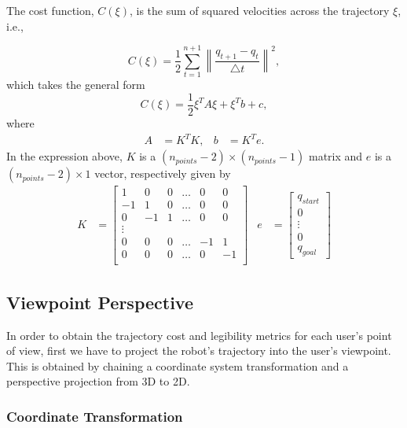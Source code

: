 \documentclass[a4paper,11pt,times,doublespace]{article}
\begin{document}
The cost function, $C(\xi)$, is the sum of squared velocities across the trajectory $\xi$, i.e.,

\begin{equation*}
	C(\xi) = \frac{1}{2} \sum_{t=1}^{n+1} \left\| \frac{q_{t+1} - q_t}{\triangle t} \right\|^2,
\end{equation*}
%
which takes the general form
%
\begin{equation*}
C(\xi)=\frac{1}{2}\xi^TA\xi + \xi^Tb + c,
\end{equation*}
%
where
%
\begin{align*}
	A&= K^TK, & b&= K^Te.
\end{align*}
%
In the expression above, $K$ is a $(n_{points}-2)\times(n_{points}-1)$ matrix and $e$ is a $(n_{points}-2)\times 1$ vector, respectively given by
%
\begin{align*}
	K&= \begin{bmatrix}
		 1 &  0 & 0 & \ldots &  0 &  0 \\
		-1 &  1 & 0 & \ldots &  0 &  0 \\
		 0 & -1 & 1 & \ldots &  0 &  0 \\
		\vdots  \\
		 0 &  0 & 0 & \ldots & -1 &  1 \\
		 0 &  0 & 0 & \ldots &  0 & -1 \\
	\end{bmatrix} &
	e&= \begin{bmatrix}
		q_{start} \\
		0 \\
		\vdots\\
		0\\
		q_{goal}
	\end{bmatrix}
\end{align*}

\subsection{Viewpoint Perspective}

In order to obtain the trajectory cost and legibility metrics for each user's point of view, first we have to project the robot's trajectory into the user's viewpoint. This is obtained by chaining a coordinate system transformation and a perspective projection from 3D to 2D.

\subsubsection{Coordinate Transformation}
\end{document}

